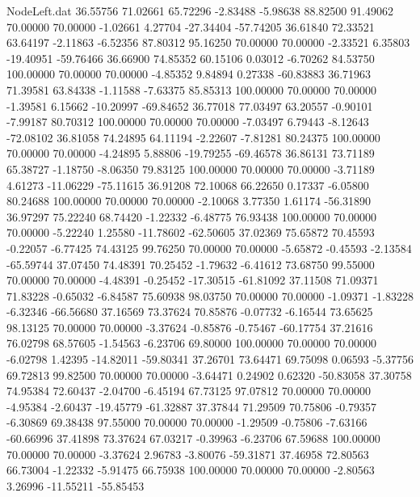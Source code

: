 \begin{filecontents}{NodeLeft.dat}
  36.55756   71.02661   65.72296    -2.83488   -5.98638   88.82500   91.49062   70.00000   70.00000   -1.02661    4.27704  -27.34404  -57.74205
  36.61840   72.33521   63.64197    -2.11863   -6.52356   87.80312   95.16250   70.00000   70.00000   -2.33521    6.35803  -19.40951  -59.76466
  36.66900   74.85352   60.15106     0.03012   -6.70262   84.53750  100.00000   70.00000   70.00000   -4.85352    9.84894    0.27338  -60.83883
  36.71963   71.39581   63.84338    -1.11588   -7.63375   85.85313  100.00000   70.00000   70.00000   -1.39581    6.15662  -10.20997  -69.84652
  36.77018   77.03497   63.20557    -0.90101   -7.99187   80.70312  100.00000   70.00000   70.00000   -7.03497    6.79443   -8.12643  -72.08102
  36.81058   74.24895   64.11194    -2.22607   -7.81281   80.24375  100.00000   70.00000   70.00000   -4.24895    5.88806  -19.79255  -69.46578
  36.86131   73.71189   65.38727    -1.18750   -8.06350   79.83125  100.00000   70.00000   70.00000   -3.71189    4.61273  -11.06229  -75.11615
  36.91208   72.10068   66.22650     0.17337   -6.05800   80.24688  100.00000   70.00000   70.00000   -2.10068    3.77350    1.61174  -56.31890
  36.97297   75.22240   68.74420    -1.22332   -6.48775   76.93438  100.00000   70.00000   70.00000   -5.22240    1.25580  -11.78602  -62.50605
  37.02369   75.65872   70.45593    -0.22057   -6.77425   74.43125   99.76250   70.00000   70.00000   -5.65872   -0.45593   -2.13584  -65.59744
  37.07450   74.48391   70.25452    -1.79632   -6.41612   73.68750   99.55000   70.00000   70.00000   -4.48391   -0.25452  -17.30515  -61.81092
  37.11508   71.09371   71.83228    -0.65032   -6.84587   75.60938   98.03750   70.00000   70.00000   -1.09371   -1.83228   -6.32346  -66.56680
  37.16569   73.37624   70.85876    -0.07732   -6.16544   73.65625   98.13125   70.00000   70.00000   -3.37624   -0.85876   -0.75467  -60.17754
  37.21616   76.02798   68.57605    -1.54563   -6.23706   69.80000  100.00000   70.00000   70.00000   -6.02798    1.42395  -14.82011  -59.80341
  37.26701   73.64471   69.75098     0.06593   -5.37756   69.72813   99.82500   70.00000   70.00000   -3.64471    0.24902    0.62320  -50.83058
  37.30758   74.95384   72.60437    -2.04700   -6.45194   67.73125   97.07812   70.00000   70.00000   -4.95384   -2.60437  -19.45779  -61.32887
  37.37844   71.29509   70.75806    -0.79357   -6.30869   69.38438   97.55000   70.00000   70.00000   -1.29509   -0.75806   -7.63166  -60.66996
  37.41898   73.37624   67.03217    -0.39963   -6.23706   67.59688  100.00000   70.00000   70.00000   -3.37624    2.96783   -3.80076  -59.31871
  37.46958   72.80563   66.73004    -1.22332   -5.91475   66.75938  100.00000   70.00000   70.00000   -2.80563    3.26996  -11.55211  -55.85453

\end{filecontents}
